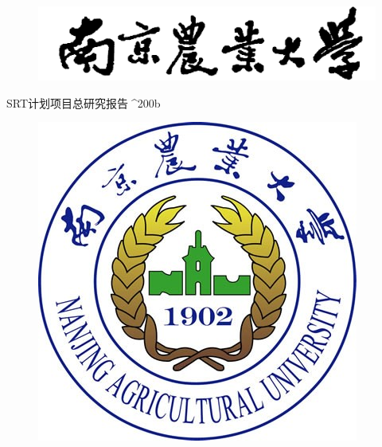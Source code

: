 \begin{figure}[!htbp]
	\centering
	\includegraphics[scale=0.11]{pic/top}
\end{figure}

\vspace{22.5pt}

\begin{center}
	{ {\fzyt SRT计划项目总研究报告}}^^^^200b \\%

\end{center}

\vspace{42.8pt}

\begin{figure}[!htbp]
	\centering
	\includegraphics[scale=0.4244]{pic/logo}
\end{figure}

